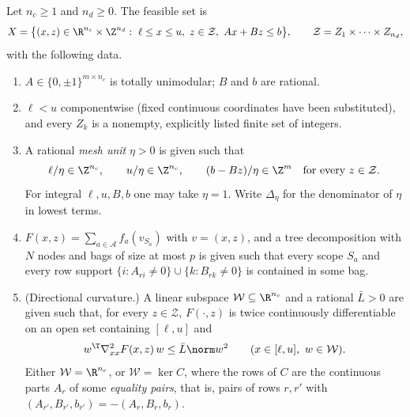 \begin{definition}\label{def:tu-model}
Let $n_c\ge1$ and $n_d\ge0$. The feasible set is
\[
X=\bigl\{(x,z)\in\R^{n_c}\times\Z^{n_d}:\ \ell\le x\le u,\ z\in\mathcal Z,\
Ax+Bz\le b\bigr\},\qquad \mathcal Z=Z_1\times\dots\times Z_{n_d},
\]
with the following data.
\begin{enumerate}[label=(\roman*)]
\item $A\in\{0,\pm1\}^{m\times n_c}$ is totally unimodular; $B$ and $b$ are
rational.
\item $\ell<u$ componentwise (fixed continuous coordinates have been
substituted), and every $Z_k$ is a nonempty, explicitly listed finite set of
integers.
\item A rational \emph{mesh unit} $\eta>0$ is given such that
\begin{equation}\label{eq:tu-align}
\ell/\eta\in\Z^{n_c},\qquad u/\eta\in\Z^{n_c},\qquad
(b-Bz)/\eta\in\Z^m\quad\text{for every }z\in\mathcal Z .
\end{equation}
For integral $\ell,u,B,b$ one may take $\eta=1$. Write $\Delta_\eta$ for the
denominator of $\eta$ in lowest terms.
\item $F(x,z)=\sum_{a\in\mathcal A}f_a(v_{S_a})$ with $v=(x,z)$, and a tree
decomposition with $N$ nodes and bags of size at most $p$ is given such that
every scope $S_a$ and every row support
$\{i:A_{ri}\ne0\}\cup\{k:B_{rk}\ne0\}$ is contained in some bag.
\item (Directional curvature.) A linear subspace $\mathcal W\subseteq\R^{n_c}$
and a rational $\bar L>0$ are given such that, for every $z\in\mathcal Z$,
$F(\cdot,z)$ is twice continuously differentiable on an open set containing
$[\ell,u]$ and
\begin{equation}\label{eq:tu-curv}
w^{\T}\nabla^2_{xx}F(x,z)\,w\le\bar L\norm w^2\qquad
(x\in[\ell,u],\ w\in\mathcal W).
\end{equation}
Either $\mathcal W=\R^{n_c}$, or $\mathcal W=\ker C$, where the rows of $C$
are the continuous parts $A_r$ of some \emph{equality pairs}, that is, pairs
of rows $r,r'$ with $(A_{r'},B_{r'},b_{r'})=-(A_r,B_r,b_r)$.
\end{enumerate}
\end{definition}

